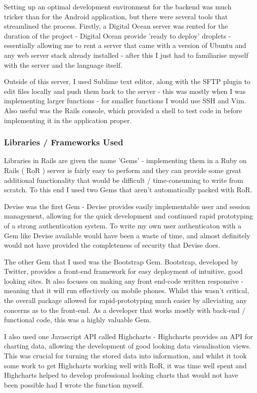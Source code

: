 \documentclass[11pt]{informatics-report}
\begin{document}
Setting up an optimal development environment for the backend was much tricker than for the Android application, but there were several tools that streamlined the process. Firstly, a Digital Ocean server was rented for the duration of the project - Digital Ocean provide 'ready to deploy' droplets - essentially allowing me to rent a server that came with a version of Ubuntu and any web server stack already installed - after this I just had to familiarise myself with the server and the language itself.

Outside of this server, I used Sublime text editor, along with the SFTP plugin to edit files locally and push them back to the server - this was mostly when I was implementing larger functions - for smaller functions I would use SSH and Vim. Also useful was the Rails console, which provided a shell to test code in before implementing it in the application proper.

\subsubsection{Libraries / Frameworks Used}

Libraries in Rails are given the name 'Gems' - implementing them in a Ruby on Rails ( RoR ) server is fairly easy to perform and they can provide some great additional functionality that would be difficult / time-consuming to write from scratch. To this end I used two Gems that aren't automatically packed with RoR.

Devise was the first Gem - Devise provides easily implementable user and session management, allowing for the quick development and continued rapid prototyping of a strong authentication system. To write my own user authenticaton with a Gem like Devise available would have been a waste of time, and almost definitely would not have provided the completeness of security that Devise does. 

The other Gem that I used was the Bootstrap Gem. Bootstrap, developed by Twitter, provides a front-end framework for easy deployment of intuitive, good looking sites. It also focuses on making any front end-code written responsive - meaning that it will run effectively on mobile phones. Whilst this wasn't critical, the overall package allowed for rapid-prototyping much easier by alleviating any concerns as to the front-end. As a developer that works mostly with back-end / functional code, this was a highly valuable Gem.

I also used one Javascript API called Highcharts - Highcharts provides an API for charting data, allowing the development of good looking data visualisation views. This was crucial for turning the stored data into information, and whilst it took some work to get Highcharts working well with RoR, it was time well spent and Highcharts helped to develop professional looking charts that would not have been possible had I wrote the function myself.
\end{document}
